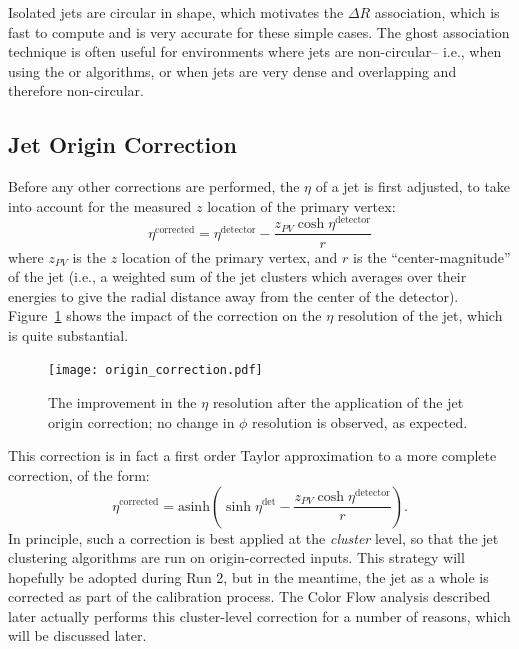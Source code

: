 Isolated \antikt jets are circular in shape, which motivates the $\Delta R$ association, which is fast to compute and is very accurate for these simple cases. The ghost association technique is often useful for environments where jets are non-circular-- i.e., when using the \kt or \ca algorithms, or when jets are very dense and overlapping and therefore non-circular.



\subsection{Jet Origin Correction}

Before any other corrections are performed, the $\eta$ of a jet is first adjusted, to take into account for the measured $z$ location of the primary vertex:
%
\begin{equation}
\eta^\mathrm{corrected} = \eta^\mathrm{detector} - \frac{z_{PV} \cosh \eta^\mathrm{detector} }{r}
\end{equation}
%
where $z_{PV}$ is the $z$ location of the primary vertex, and $r$ is the ``center-magnitude'' of the jet (i.e., a weighted sum of the jet clusters which averages over their energies to give the radial distance away from the center of the detector). Figure~\ref{fig:jet-reconstruction:origin_correction} shows the impact of the correction on the $\eta$ resolution of the jet, which is quite substantial.


\begin{figure}
\centering
\texttt{[image: origin\_correction.pdf]}
\label{fig:jet-reconstruction:origin_correction}
\caption{The improvement in the $\eta$ resolution after the application of the jet origin correction; no change in $\phi$ resolution is observed, as expected.}
\end{figure}


This correction is in fact a first order Taylor approximation to a more complete correction, of the form:
%
\begin{equation}
\eta^\mathrm{corrected} = \mathrm{asinh} \left(\sinh \eta^\mathrm{det} - \frac{z_{PV} \cosh \eta^\mathrm{detector}}{r}  \right).
\end{equation}
%
In principle, such a correction is best applied at the \textit{cluster} level, so that the jet clustering algorithms are run on origin-corrected inputs. This strategy will hopefully be adopted during Run 2, but in the meantime, the jet as a whole is corrected as part of the calibration process. The Color Flow analysis described later actually performs this cluster-level correction for a number of reasons, which will be discussed later.


